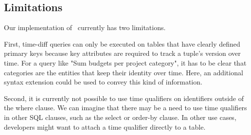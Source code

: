 
\subsection{Limitations}

Our implementation of \SQLextension\ currently has two limitations.

First, time-diff queries can only be executed on tables that have clearly defined primary keys because key attributes are required to track a tuple's version over time.
For a query like "Sum budgets per project category", it has to be clear that categories are the entities that keep their identity over time.
Here, an additional syntax extension could be used to convey this kind of information.

Second, it is currently not possible to use time qualifiers on identifiers outside of the where clause.
We can imagine that there may be a need to use time qualifiers in other SQL clauses, such as the select or order-by clause.
In other use cases, developers might want to attach a time qualifier directly to a table.



\tmpEnd